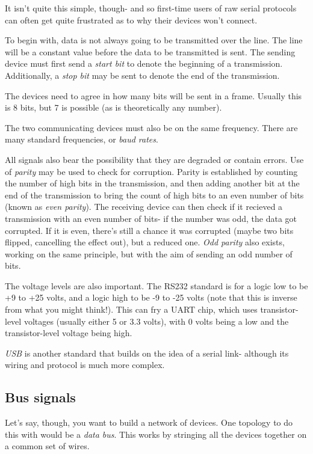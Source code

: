 It isn't quite this simple, though- and so first-time users of raw serial protocols can often get quite frustrated as to why their devices won't connect.

To begin with, data is not always going to be transmitted over the line. The line will be a constant value before the data to be transmitted is sent. The sending device must first send a \textit{start bit} to denote the beginning of a transmission. Additionally, a \textit{stop bit} may be sent to denote the end of the transmission.

The devices need to agree in how many bits will be sent in a frame. Usually this is 8 bits, but 7 is possible (as is theoretically any number).

The two communicating devices must also be on the same frequency. There are many standard frequencies, or \textit{baud rates}. 

All signals also bear the possibility that they are degraded or contain errors. Use of \textit{parity} may be used to check for corruption. Parity is established by counting the number of high bits in the transmission, and then adding another bit at the end of the transmission to bring the count of high bits to an even number of bits (known as \textit{even parity}). The receiving device can then check if it recieved a transmission with an even number of bits- if the number was odd, the data got corrupted. If it is even, there's still a chance it was corrupted (maybe two bits flipped, cancelling the effect out), but a reduced one. \textit{Odd parity} also exists, working on the same principle, but with the aim of sending an odd number of bits.

The voltage levels are also important. The RS232 standard is for a logic low to be +9 to +25 volts, and a logic high to be -9 to -25 volts (note that this is inverse from what you might think!). This can fry a UART chip, which uses transistor-level voltages (usually either 5 or 3.3 volts), with 0 volts being a low and the transistor-level voltage being high.

\textit{USB} is another standard that builds on the idea of a serial link- although its wiring and protocol is much more complex.

\subsection{Bus signals} %

Let's say, though, you want to build a network of devices. One topology to do this with would be a \textit{data bus}. This works by stringing all the devices together on a common set of wires.

